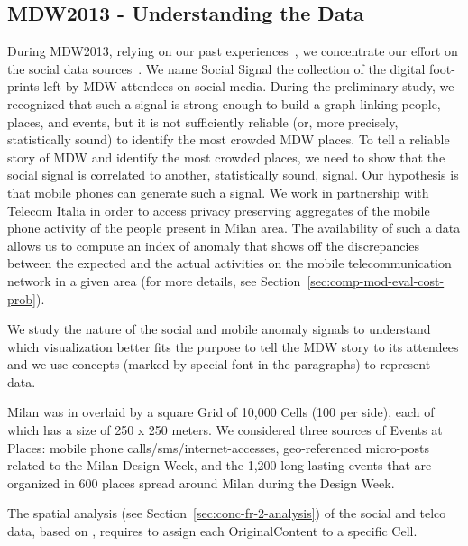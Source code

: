 \subsection{MDW2013 - Understanding the Data} \label{sec:cs-mdw-2013}
During MDW2013, relying on our past experiences~\cite{DBLP:conf/semweb/BalduiniVDTPC13,DBLP:journals/internet/BalduiniBVHH14}, we concentrate our effort on the social data sources~\cite{pentland2007social}.
We name Social Signal the collection of the digital foot-prints left by MDW attendees on social media. 
During the preliminary study, we recognized that such a signal is strong enough to build a graph linking people, places, and events, but it is not sufficiently reliable (or, more precisely, statistically sound) to identify the most crowded MDW places. 
To tell a reliable story of MDW and identify the most crowded places, we need to show that the social signal is correlated to another, statistically sound, signal. Our hypothesis is that mobile phones can generate such a signal.
We work in partnership with Telecom Italia in order to access privacy preserving aggregates of the mobile phone activity of the people present in Milan area. 
The availability of such a data allows us to compute an index of anomaly that shows off the discrepancies between the expected and the actual activities on the mobile telecommunication network in a given area (for more details, see Section~\ref{sec:comp-mod-eval-cost-prob}).

We study the nature of the social and mobile anomaly signals to understand which visualization better fits the purpose to tell the MDW story to its attendees and we use \frappe{} concepts (marked by special font in the paragraphs) to represent data.

Milan was in overlaid by a square \textsf{Grid} of 10,000 \textsf{Cell}s (100 per side), each of which has a size of 250 x 250 meters. 
We considered three sources of \textsf{Event}s at \textsf{Place}s: mobile phone calls/sms/internet-accesses, geo-referenced micro-posts related to the Milan Design Week, and the 1,200 long-lasting events that are organized in 600 places spread around Milan during the Design Week. 


The spatial analysis (see Section~\ref{sec:conc-fr-2-analysis}) of the social and telco data, based on \frappe{}, requires to assign each \textsf{OriginalContent} to a specific \textsf{Cell}.

